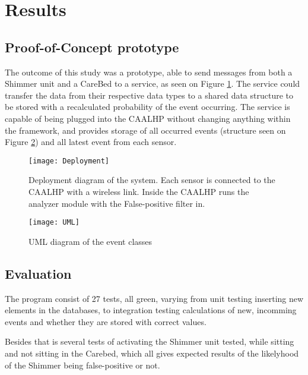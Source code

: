 \section{Results}

\vspace{-10pt}
\subsection{Proof-of-Concept prototype}
\vspace{-15pt}

The outcome of this study was a prototype, able to send messages from both a Shimmer unit and a CareBed to a service, as seen on Figure \ref{fig:deployment}.
The service could transfer the data from their respective data types to a shared data structure to be stored with a recalculated probability of the event occurring.
The service is capable of being plugged into the CAALHP without changing anything within the framework, and provides storage of all occurred events (structure seen on Figure \ref{fig:UML}) and all latest event from each sensor.

\begin{figure}[hbtp]
	\centering
	\texttt{[image: Deployment]}
	\caption{Deployment diagram of the system. 
		Each sensor is connected to the CAALHP with a wireless link.
		Inside the CAALHP runs the analyzer module with the False-positive filter in.}
	\label{fig:deployment}
\end{figure}

\begin{figure}[hbtp]
	\centering
	\texttt{[image: UML]}
	\caption{UML diagram of the event classes}
	\label{fig:UML}
\end{figure}


\vspace{-10pt}
\subsection{Evaluation}
\vspace{-15pt}

The program consist of 27 tests, all green, varying from unit testing inserting new elements in the databases, to integration testing calculations of new, incomming events and whether they are stored with correct values.

Besides that is several tests of activating the Shimmer unit tested, while sitting and not sitting in the Carebed, which all gives expected results of the likelyhood of the Shimmer being false-positive or not.



